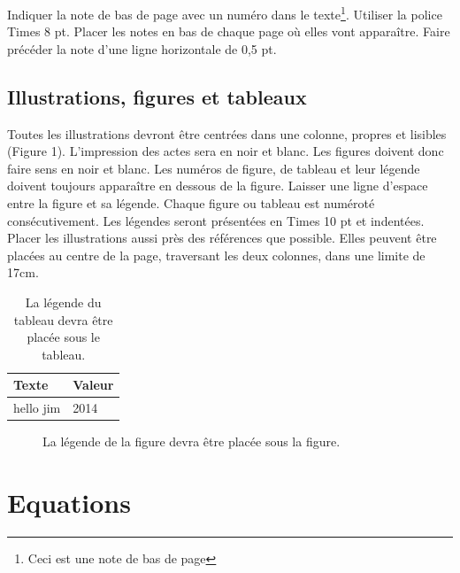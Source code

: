 \documentclass{article}
\begin{document}
Indiquer la note de bas de page avec un numéro dans le texte\footnote{Ceci est une note de bas de page}.  Utiliser la police Times 8 pt. Placer les notes en bas de chaque page où elles vont apparaître. Faire précéder la note d'une ligne horizontale de 0,5 pt.

\subsection{Illustrations, figures et tableaux}

Toutes les illustrations devront être centrées dans une colonne, propres et lisibles (Figure 1). L'impression des actes sera en noir et blanc. Les figures doivent donc faire sens en noir et blanc. Les numéros de figure, de tableau et leur légende doivent toujours apparaître en dessous de la figure. Laisser une ligne d'espace entre la figure et sa légende. Chaque figure ou tableau est numéroté consécutivement. Les légendes seront présentées en Times 10 pt et indentées. Placer les illustrations aussi près des références que possible. Elles peuvent être placées au centre de la page, traversant les deux colonnes, dans une limite de 17cm.

\begin{table}
\begin{center}
\begin{tabular}{|l|l|}
\hline
Texte & Valeur \\
\hline
hello jim  & 2014 \\
\hline
\end{tabular}
\end{center}
\caption{La légende du tableau devra être placée sous le tableau.}
\label{tab:example}
\end{table}

\begin{figure}
\centerline{}
\caption{La légende de la figure devra être placée sous la figure.}
\label{fig:example}
\end{figure}

\section{Equations}
\end{document}
